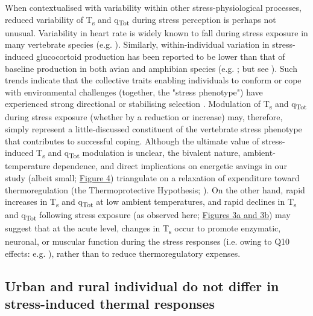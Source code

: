 \documentclass[12pt]{article}
\begin{document}
\noindent When contextualised with variability within other stress-physiological processes, reduced variability of T\textsubscript{s} and q\textsubscript{Tot} during stress perception is perhaps not unusual. Variability in heart rate is widely known to fall during stress exposure in many vertebrate species (e.g. \citealt{visser_2002,vonborell_2007,cyr_2009}). Similarly, within-individual variation in stress-induced glucocortoid production has been reported to be lower than that of baseline production in both avian and amphibian species (e.g. \citealt{cockrem_2002,rensel_2011,narayan_2012,grace_2014}; but see \citealt{narayan_2013,baugh_2014,lendvai_2015}). Such trends indicate that the collective traits enabling individuals to conform or cope with environmental challenges (together, the "stress phenotype") have experienced strong directional or stabilising selection \citep{ellis_2006}. Modulation of T\textsubscript{s} and q\textsubscript{Tot} during stress exposure (whether by a reduction or increase) may, therefore, simply represent a little-discussed constituent of the vertebrate stress phenotype that contributes to successful coping. Although the ultimate value of stress-induced T\textsubscript{s} and q\textsubscript{Tot} modulation is unclear, the bivalent nature, ambient-temperature dependence, and direct implications on energetic savings in our study (albeit small; \hyperref[Fig4.4]{Figure 4}) triangulate on a relaxation of expenditure toward thermoregulation (the Thermoprotective Hypothesis; \citealt{robertson_2020a}). On the other hand, rapid increases in T\textsubscript{s} and q\textsubscript{Tot} at low ambient temperatures, and rapid declines in T\textsubscript{s} and q\textsubscript{Tot} following stress exposure (as observed here; \hyperref[Fig4.3]{Figures 3a and 3b}) may suggest that at the acute level, changes in T\textsubscript{s} occur to promote enzymatic, neuronal, or muscular function during the stress responses (i.e. owing to Q10 effects: e.g. \citealt{carr_2013}), rather than to reduce thermoregulatory expenses.\vspace{0.5cm}
 
\subsection{Urban and rural individual do not differ in stress-induced thermal responses}
\vspace{0.5cm}
\end{document}
